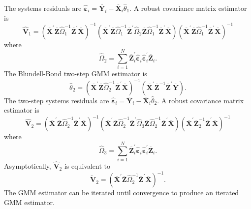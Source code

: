 \documentclass[10pt]{article}
\begin{document}
The systems residuals are $\widehat{\boldsymbol{\varepsilon}}_{i}=\overline{\boldsymbol{Y}}_{i}-\overline{\boldsymbol{X}}_{i} \widehat{\theta}_{1}$. A robust covariance matrix estimator is
$$
\widehat{\boldsymbol{V}}_{1}=\left(\overline{\boldsymbol{X}}^{\prime} \overline{\boldsymbol{Z}} \widehat{\Omega}_{1}^{-1} \overline{\boldsymbol{Z}}^{\prime} \overline{\boldsymbol{X}}\right)^{-1}\left(\overline{\boldsymbol{X}}^{\prime} \overline{\boldsymbol{Z}} \widehat{\Omega}_{1}^{-1} \overline{\boldsymbol{Z}}^{\prime} \widehat{\Omega}_{2} \overline{\boldsymbol{Z}} \widehat{\Omega}_{1}^{-1} \overline{\boldsymbol{Z}}^{\prime} \overline{\boldsymbol{X}}\right)\left(\overline{\boldsymbol{X}}^{\prime} \overline{\boldsymbol{Z}} \widehat{\Omega}_{1}^{-1} \overline{\boldsymbol{Z}}^{\prime} \overline{\boldsymbol{X}}\right)^{-1}
$$
where
$$
\widehat{\Omega}_{2}=\sum_{i=1}^{N} \overline{\boldsymbol{Z}}_{i}^{\prime} \widehat{\boldsymbol{\varepsilon}}_{i} \widehat{\boldsymbol{\varepsilon}}_{i}^{\prime} \overline{\boldsymbol{Z}}_{i} .
$$
The Blundell-Bond two-step GMM estimator is
$$
\widehat{\theta}_{2}=\left(\overline{\boldsymbol{X}}^{\prime} \overline{\boldsymbol{Z}} \widehat{\Omega}_{2}^{-1} \overline{\boldsymbol{Z}}^{\prime} \overline{\boldsymbol{X}}\right)^{-1}\left(\overline{\boldsymbol{X}}^{\prime} \overline{\boldsymbol{Z}}^{-1} \overline{\boldsymbol{Z}}^{\prime} \overline{\boldsymbol{Y}}\right) .
$$
The two-step systems residuals are $\widehat{\boldsymbol{\varepsilon}}_{i}=\overline{\boldsymbol{Y}}_{i}-\overline{\boldsymbol{X}}_{i} \widehat{\theta}_{2}$. A robust covariance matrix estimator is
$$
\widehat{\boldsymbol{V}}_{2}=\left(\overline{\boldsymbol{X}}^{\prime} \overline{\boldsymbol{Z}} \widehat{\Omega}_{2}^{-1} \overline{\boldsymbol{Z}}^{\prime} \overline{\boldsymbol{X}}\right)^{-1}\left(\overline{\boldsymbol{X}}^{\prime} \overline{\boldsymbol{Z}} \widehat{\Omega}_{2}^{-1} \overline{\boldsymbol{Z}}^{\prime} \widehat{\Omega}_{3} \overline{\boldsymbol{Z}} \widehat{\Omega}_{2}^{-1} \overline{\boldsymbol{Z}}^{\prime} \overline{\boldsymbol{X}}\right)\left(\overline{\boldsymbol{X}}^{\prime} \overline{\boldsymbol{Z}}_{2}^{-1} \overline{\boldsymbol{Z}}^{\prime} \overline{\boldsymbol{X}}\right)^{-1}
$$
where
$$
\widehat{\Omega}_{3}=\sum_{i=1}^{N} \overline{\boldsymbol{Z}}_{i}^{\prime} \widehat{\boldsymbol{\varepsilon}}_{i} \widehat{\boldsymbol{\varepsilon}}_{i}^{\prime} \overline{\boldsymbol{Z}}_{i} .
$$
Asymptotically, $\widehat{\boldsymbol{V}}_{2}$ is equivalent to
$$
\widetilde{\boldsymbol{V}}_{2}=\left(\overline{\boldsymbol{X}}^{\prime} \overline{\boldsymbol{Z}} \widehat{\Omega}_{2}^{-1} \overline{\boldsymbol{Z}}^{\prime} \overline{\boldsymbol{X}}\right)^{-1} .
$$
The GMM estimator can be iterated until convergence to produce an iterated GMM estimator.
\end{document}
